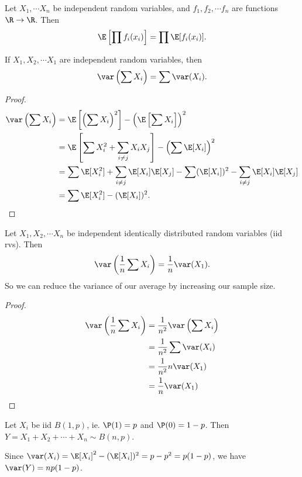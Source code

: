 \documentclass[a4paper]{article}
\begin{document}
\begin{cor}
  Let $X_1,\cdots X_n$ be independent random variables, and $f_1, f_2, \cdots f_n$ are functions $\R\to \R$. Then
  \[
    \E\left[\prod f_i(x_i)\right] = \prod \E[f_i(x_i)].
  \]
\end{cor}

\begin{thm}
  If $X_1, X_2, \cdots X_1$ are independent random variables, then
  \[
    \var\left(\sum X_i\right) = \sum \var (X_i).
  \]
\end{thm}

\begin{proof}
  \begin{align*}
    \var\left(\sum X_i\right) &= \E\left[\left(\sum X_i\right)^2\right] - \left(\E\left[\sum X_i\right]\right)^2\\
    &= \E\left[\sum X_i^2 + \sum_{i \not =j} X_iX_j\right] - \left(\sum\E [X_i]\right)^2\\
    &= \sum \E[X_i^2] + \sum_{i\not= j}\E[X_i]\E[X_j] - \sum(\E[X_i])^2 - \sum_{i\not= j}\E[X_i]\E[X_j]\\
    &= \sum \E[X_i^2] - (\E[X_i])^2.
  \end{align*}
\end{proof}

\begin{cor}
 Let $X_1, X_2, \cdots X_n$ be independent identically distributed random variables (iid rvs). Then
 \[
   \var\left(\frac{1}{n}\sum X_i\right) = \frac{1}{n}\var (X_1).
 \]
 So we can reduce the variance of our average by increasing our sample size.
\end{cor}

\begin{proof}
  \begin{align*}
    \var\left(\frac{1}{n}\sum X_i\right) &= \frac{1}{n^2}\var\left(\sum X_i\right)\\
    &= \frac{1}{n^2}\sum \var(X_i)\\
    &= \frac{1}{n^2} n \var(X_1)\\
    &= \frac{1}{n}\var (X_1)
  \end{align*}
\end{proof}

\begin{eg}
  Let $X_i$ be iid $B(1, p)$, ie. $\P(1) = p$ and $\P(0) = 1 - p$. Then $Y = X_1 + X_2 + \cdots + X_n \sim B(n, p)$. 
  
  Since $\var(X_i) = \E[X_i]^2 - (\E[X_i])^2 = p - p^2 = p(1 - p)$, we have $\var (Y) = np(1 - p)$.
\end{eg}
\end{document}

